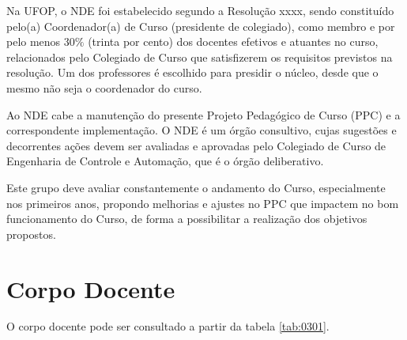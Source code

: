 Na UFOP, o NDE foi estabelecido segundo a Resolução xxxx, sendo constituído pelo(a) Coordenador(a) de Curso (presidente de colegiado), como membro e por pelo menos $30\%$ (trinta por cento) dos docentes efetivos e atuantes no curso, relacionados pelo Colegiado de Curso que satisfizerem os requisitos previstos na resolução. Um dos professores é escolhido para presidir o núcleo, desde que o mesmo não seja o coordenador do curso.
 
Ao NDE cabe a manutenção do presente Projeto Pedagógico de Curso (PPC) e a correspondente implementação. O NDE é um órgão consultivo, cujas sugestões e decorrentes ações devem ser avaliadas e aprovadas pelo Colegiado de Curso de Engenharia de Controle e Automação, que é o órgão deliberativo. 

Este grupo deve avaliar constantemente o andamento do Curso, especialmente nos primeiros anos, propondo melhorias e ajustes no PPC que impactem no bom funcionamento do Curso, de forma a possibilitar a realização dos objetivos propostos.

\section{Corpo Docente}
O corpo docente pode ser consultado a partir da tabela \ref{tab:0301}.

